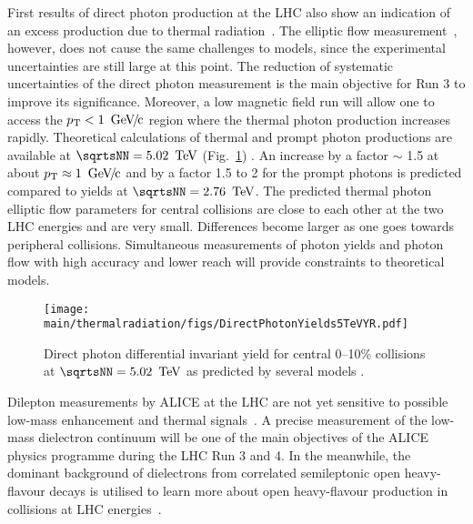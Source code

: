 \documentclass[../report.tex]{subfiles}
\providecommand{\main}{..}
\begin{document}
First results of direct photon production at the LHC also show an indication of an excess production due to thermal radiation~\cite{Adam:2015lda}. The elliptic flow measurement~\cite{Acharya:2018bdy}, however, does not cause the same challenges to models, since the experimental uncertainties are still large at this point.
The reduction of systematic uncertainties of the direct photon measurement is the main objective for Run 3 to improve its significance. Moreover, a low magnetic field run will allow one to access the $\pT < \unit[1]{\UGeVc}$ region where the thermal photon production increases rapidly. Theoretical calculations of thermal and prompt photon productions are available at $\sqrtsNN = \unit[5.02]{\UTeV}$ (Fig.~\ref{fig:LHCExpectations_RealPhotons}) \cite{Paquet:2015lta,Paquet:2016ime,Paquet:2017wji,Dasgupta:2018pjm,vanHees:2014ida}. An increase by a factor $\sim$ 1.5 at about $\pT \approx \unit[1]{\UGeVc}$ and by a factor 1.5 to 2 for the prompt photons is predicted compared to yields at $\sqrtsNN = \unit[2.76]{\UTeV}$. The predicted thermal photon elliptic flow parameters for central collisions are close to each other at the two LHC energies  and are very small. Differences become larger as one goes towards peripheral collisions. Simultaneous measurements of photon yields and photon flow with high accuracy and lower \pT{} reach will provide constraints to theoretical models.
\begin{figure}[htb]
\centering
\texttt{[image: \\main/thermalradiation/figs/DirectPhotonYields5TeVYR.pdf]}
\caption{Direct photon differential invariant yield for central 0--10\% \PbPb{} collisions at $\sqrtsNN = \unit[5.02]{\UTeV}$ as predicted by several models \cite{Paquet:2015lta,Paquet:2016ime,Paquet:2017wji,Dasgupta:2018pjm,vanHees:2014ida}.}
\label{fig:LHCExpectations_RealPhotons}
\end{figure}


Dilepton measurements by ALICE at the LHC are not yet sensitive to possible low-mass enhancement and thermal signals~\cite{Acharya:2018nxm}. A precise measurement of the low-mass dielectron continuum will be one of the main objectives of the ALICE physics programme during the LHC Run 3 and 4. In the meanwhile, the dominant background of dielectrons from correlated semileptonic open heavy-flavour decays is utilised to learn more about open heavy-flavour production in \pp{} collisions at LHC energies~\cite{Acharya:2018ohw,Acharya:2018kkj}.
\end{document}

